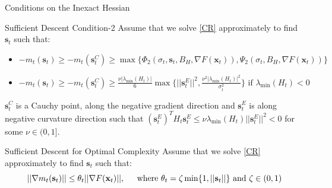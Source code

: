 \documentclass{beamer}
\newcommand{\g}{\nabla}
\newcommand{\xbold}{\mathbf{x}}
\newcommand{\sbold}{\mathbf{s}}
\newcommand{\mineig}{\lambda_{\min}}
\begin{document}
\begin{frame}{Conditions on the Inexact Hessian}
\begin{alertblock}{Sufficient Descent Condition-2}
Assume that we solve \ref{CR} approximately to find \(\sbold_{t}\) such that:
\begin{itemize}
\item \(-m_{t}(\sbold_{t}) \geq -m_{t}(\sbold_{t}^{C}) \geq \max\lbrace\Phi_{2}(\sigma_{t}, \sbold_{t}, B_{H}, \g F(\xbold_{t})), \Psi_{2}(\sigma_{t}, B_{H}, \g F(\xbold_{t}))\rbrace\)
\item \(-m_{t}(\sbold_{t}) \geq -m_{t}(\sbold_{t}^{C}) \geq \frac{\nu|\mineig(H_{t})|}{6} \max\lbrace ||\sbold_{t}^{E}||^{2}, \frac{\nu^{2}|\mineig(H_{t})|^{2}}{\sigma_{t}^{2}}\rbrace \text{ if } \mineig(H_{t}) < 0\)
\end{itemize}
\(\sbold_{t}^{C}\) is a Cauchy point, along the negative gradient direction and \(\sbold_{t}^{E}\) is along negative curvature direction such that \((\sbold_{t}^{E})^{T} H_{t} \sbold_{t}^{E} \leq \nu\mineig(H_{t})||\sbold_{t}^{E}||^{2} < 0\) for some \(\nu \in (0, 1]\).
\end{alertblock}
\pause
\begin{alertblock}{Sufficient Descent for Optimal Complexity}
Assume that we solve \ref{CR} approximately to find \(\sbold_{t}\) such that:
\[||\nabla m_{t}(\sbold_{t})|| \leq \theta_{t}||\g F(\xbold_{t})||, \hspace{4mm} \text{ where }\theta_{t} = \zeta\min\{1, ||\sbold_{t}||\} \text{ and } \zeta \in (0, 1) \]
\end{alertblock}
\end{frame}
\end{document}
